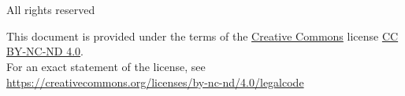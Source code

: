 ﻿%
\newpage
\renewcommand{\headrulewidth}{1pt}
\thispagestyle{empty}%
\mbox{}\\\vfill
{}
{\fntHeros
\copyrightstamp
\\All rights reserved
}
\vfill
This document is provided under the terms of 
the \href{https://creativecommons.org/}{Creative Commons} license \href{https://creativecommons.org/licenses/}{CC BY-NC-ND 4.0}.
\\For an exact statement of the license, see 
\\\indentx\url{https://creativecommons.org/licenses/by-nc-nd/4.0/legalcode}


